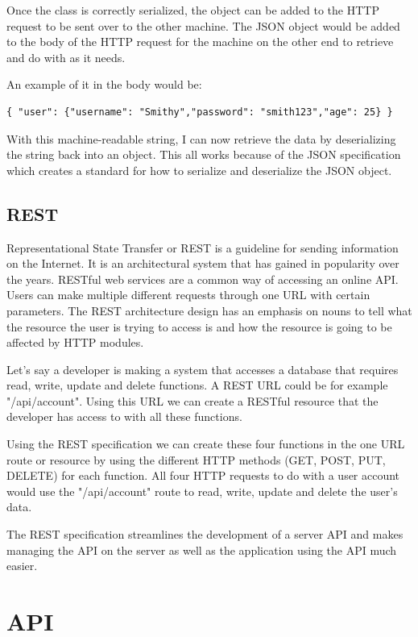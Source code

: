 Once the class is correctly serialized, the object can be added to the HTTP request to be sent over to the other machine. The JSON object would be added to the body of the HTTP request for the machine on the other end to retrieve and do with as it needs.

An example of it in the body would be:
\begin{verbatim}
{ "user": {"username": "Smithy","password": "smith123","age": 25} }
\end{verbatim}

With this machine-readable string, I can now retrieve the data by deserializing the string back into an object. This all works because of the JSON specification which creates a standard for how to serialize and deserialize the JSON object.

\subsection{REST}
Representational State Transfer or REST is a guideline for sending information on the Internet. It is an architectural system that has gained in popularity over the years. RESTful web services are a common way of accessing an online API. Users can make multiple different requests through one URL with certain parameters. The REST architecture design has an emphasis on nouns to tell what the resource the user is trying to access is and how the resource is going to be affected by HTTP modules. 

Let's say a developer is making a system that accesses a database that requires read, write, update and delete functions. A REST URL could be for example "/api/account". Using this URL we can create a RESTful resource that the developer has access to with all these functions.

Using the REST specification we can create these four functions in the one URL route or resource by using the different HTTP methods (GET, POST, PUT, DELETE) for each function. All four HTTP requests to do with a user account would use the "/api/account" route to read, write, update and delete the user's data.

The REST specification streamlines the development of a server API and makes managing the API on the server as well as the application using the API much easier.

\section{API}
